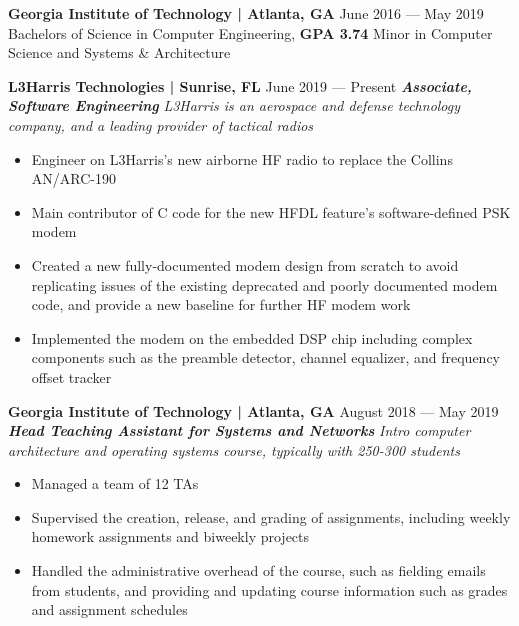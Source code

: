 

\begin{samepage}
\textbf{Georgia Institute of Technology | Atlanta, GA}
\hfill
June 2016 --- May 2019
\newline
Bachelors of Science in Computer Engineering, \textbf{GPA 3.74}
\newline
Minor in Computer Science and Systems \& Architecture
\end{samepage}
\smallskip


\begin{samepage}
\textbf{L3Harris Technologies | Sunrise, FL}
\hfill
June 2019 --- Present
\newline
\textbf{\textit{Associate, Software Engineering}}
\newline
\textit{L3Harris is an aerospace and defense technology company, and a leading provider of tactical radios}
\begin{itemize}[noitemsep,topsep=0pt,parsep=0pt,partopsep=0pt]
    \item Engineer on L3Harris's new airborne HF radio to replace the Collins AN/ARC-190
    \item Main contributor of C code for the new HFDL feature's software-defined PSK modem
    \item Created a new fully-documented modem design from scratch to avoid replicating issues of the existing deprecated and poorly documented modem code, and provide a new baseline for further HF modem work
    \item Implemented the modem on the embedded DSP chip including complex components such as the preamble detector, channel equalizer, and frequency offset tracker
\end{itemize}
\end{samepage}
\smallskip

\begin{samepage}
\textbf{Georgia Institute of Technology | Atlanta, GA}
\hfill
August 2018 --- May 2019
\newline
\textbf{\textit{Head Teaching Assistant for Systems and Networks}}
\newline
\textit{Intro computer architecture and operating systems course, typically with 250-300 students}
\begin{itemize}[noitemsep,topsep=0pt,parsep=0pt,partopsep=0pt]
    \item Managed a team of 12 TAs
    \item Supervised the creation, release, and grading of assignments, including weekly homework assignments and biweekly projects
    \item Handled the administrative overhead of the course, such as fielding emails from students, and providing and updating course information such as grades and assignment schedules
\end{itemize}
\end{samepage}
\smallskip

